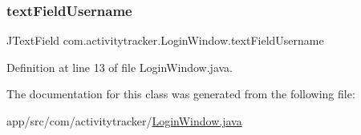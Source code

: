 \mbox{\label{classcom_1_1activitytracker_1_1_login_window_aba181dcec114c349a67304406bcce92a}} 
\subsubsection{\texorpdfstring{text\+Field\+Username}{textFieldUsername}}
{\footnotesize\ttfamily J\+Text\+Field com.\+activitytracker.\+Login\+Window.\+text\+Field\+Username\hspace{0.3cm}{\ttfamily [private]}}



Definition at line 13 of file Login\+Window.\+java.



The documentation for this class was generated from the following file\+:\begin{DoxyCompactItemize}
\item 
app/src/com/activitytracker/\mbox{\hyperlink{_login_window_8java}{Login\+Window.\+java}}\end{DoxyCompactItemize}
